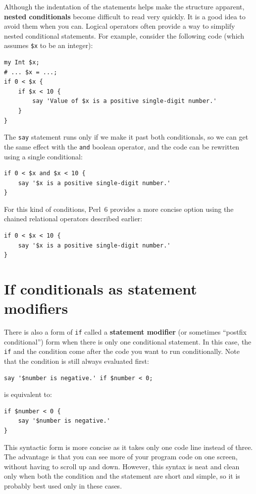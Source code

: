 Although the indentation of 
the statements helps make the structure apparent, 
{\bf nested conditionals} become difficult to read very 
quickly.  It is a good idea to avoid them when you can.
Logical operators often provide a way to simplify nested 
conditional statements.  For example, consider the 
following code (which assumes \verb'$x' to be an integer):

\begin{verbatim}
my Int $x;
# ... $x = ...;
if 0 < $x {
    if $x < 10 {
        say 'Value of $x is a positive single-digit number.'
    }
}
\end{verbatim}
%
The {\tt say} statement runs only if we make it past both
conditionals, so we can get the same effect with the {\tt and} 
boolean operator, and the code can be rewritten using a 
single conditional:

\begin{verbatim}
if 0 < $x and $x < 10 {
    say '$x is a positive single-digit number.'
}
\end{verbatim}

For this kind of conditions, Perl~6 provides a more concise option using the chained relational operators described earlier:

\begin{verbatim}
if 0 < $x < 10 {
    say '$x is a positive single-digit number.'
}
\end{verbatim}

\section{If conditionals as statement modifiers}
 
 

There is also a form of {\tt if} called a {\bf statement 
modifier} (or sometimes  ``postfix conditional'') form when there is only 
one conditional statement. In this case, the {\tt if} and the 
condition come after the code you want to run conditionally. Note 
that the condition is still always evaluated first:

\begin{verbatim}
say '$number is negative.' if $number < 0;
\end{verbatim}
%
is equivalent to:
\begin{verbatim}
if $number < 0 {
    say '$number is negative.' 
}
\end{verbatim}
%
This syntactic form is more concise as it takes only one code 
line instead of three. The advantage is that you can see more
of your program code on one screen, without having to scroll up 
and down. However, this syntax is neat and clean only when 
both the condition and the statement are short and simple, so it 
is probably best used only in these cases.

